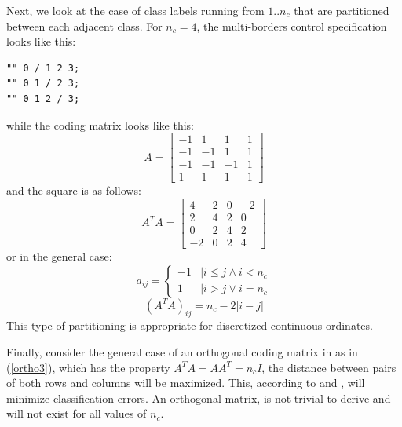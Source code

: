 \documentclass{article}
\begin{document}
Next, we look at the case of class labels running from $1..n_c$ that are 
partitioned between each adjacent class.  For $n_c=4$, the multi-borders
control specification looks like this:
\begin{verbatim}
"" 0 / 1 2 3;
"" 0 1 / 2 3;
"" 0 1 2 / 3;
\end{verbatim}
while the coding matrix looks like this:
\begin{equation}
A = 
\begin{bmatrix}
-1 & 1 & 1 & 1 \\
-1 & -1 & 1 & 1 \\
-1 & -1 & -1 & 1 \\
1 & 1 & 1 & 1
\end{bmatrix}
\end{equation}
and the square is as follows:
\begin{equation}
A^T A =
\begin{bmatrix}
4 & 2 & 0 & -2 \\
2 & 4 & 2 & 0 \\
0 & 2 & 4 & 2 \\
-2 & 0 & 2 & 4 
\end{bmatrix}
\end{equation}
or in the general case:
\begin{equation}
a_{ij} = \left \lbrace 
\begin{array}{rl}
-1 & | i \le j \land i < n_c \\
1 & | i > j \lor i = n_c
\end{array}
\right .
\end{equation}
\begin{equation}
(A^T A)_{ij} = 
n_c-2|i-j|
\end{equation}
This type of partitioning is appropriate for discretized continuous ordinates.

Finally, consider the general case of an orthogonal coding matrix in 
as in (\ref{ortho3}),
which has the property $A^T A = A A^T = n_c I$,
the distance between pairs of both rows and columns will be maximized.
This, according to \citet{Dietterich_Bakiri1995} and
\citet{Allwein_etal2000}, will minimize classification errors. 
An orthogonal matrix, is not trivial to
derive and will not exist for all values of $n_c$.
\end{document}
